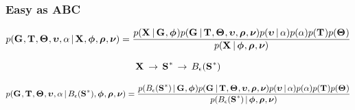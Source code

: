 \begin{frame}
    \frametitle{Easy as ABC}
    \begin{displaybox}
        \footnotesize
        \[
            p(\geneTreeVector, \divTimeMapVector, \demographicParamVector, 
            \locusMutationRateScalarVector, \locusRateHetShapeParameter \given
            \alignmentVector, \hkyModelVector, \ploidyScalarVector,
            \mutationRateScalarConstantVector) =
            \frac{p(\alignmentVector \given \geneTreeVector, \hkyModelVector)
                p(\geneTreeVector \given \divTimeMapVector, \demographicParamVector,
                \locusMutationRateScalarVector, \ploidyScalarVector,
                \mutationRateScalarConstantVector)
                p(\locusMutationRateScalarVector \given \locusRateHetShapeParameter)
                p(\locusRateHetShapeParameter)
                p(\divTimeMapVector)
                p(\demographicParamVector)}{
                p(\alignmentVector \given \hkyModelVector, \ploidyScalarVector,
                \mutationRateScalarConstantVector)}
        \]\vspace{0mm}
    \end{displaybox}

    \[ \alignmentVector \, \to \, \ssVectorObs \, \to \, \ssSpace\]

    \begin{displaybox}
        \tiny
        \[
            p(\geneTreeVector, \divTimeMapVector, \demographicParamVector, 
            \locusMutationRateScalarVector, \locusRateHetShapeParameter \given
            \ssSpace, \hkyModelVector, \ploidyScalarVector,
            \mutationRateScalarConstantVector) =
            \frac{p(\ssSpace \given \geneTreeVector, \hkyModelVector)
                p(\geneTreeVector \given \divTimeMapVector, \demographicParamVector,
                \locusMutationRateScalarVector, \ploidyScalarVector,
                \mutationRateScalarConstantVector)
                p(\locusMutationRateScalarVector \given \locusRateHetShapeParameter)
                p(\locusRateHetShapeParameter)
                p(\divTimeMapVector)
                p(\demographicParamVector)}{
                p(\ssSpace \given \hkyModelVector, \ploidyScalarVector,
                \mutationRateScalarConstantVector)}
        \]\vspace{0mm}
    \end{displaybox}
\end{frame}

